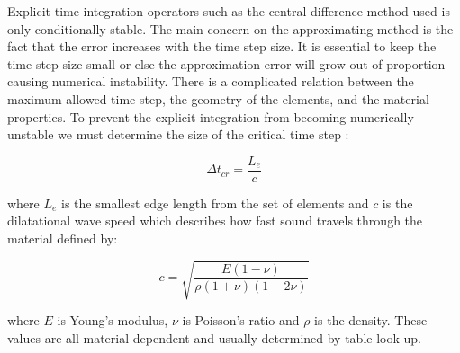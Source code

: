 Explicit time integration operators such as the central difference
method used is only conditionally stable. The main concern on the
approximating method is the fact that the error increases with the
time step size.
It is essential to keep the time step size small or else the
approximation error will grow out of proportion causing numerical
instability.
There is a complicated relation between the maximum allowed time step,
the geometry of the elements, and the material properties. To prevent
the explicit integration from becoming numerically unstable we must
determine the size of the critical time
step : 

\begin{equation}
\label{eq:delta-t-cr}
  \Delta t_{cr} = \frac{L_e}{c}
\end{equation}


where $L_e$ is the smallest edge length from the set of elements and
$c$ is the dilatational wave speed which describes how
fast sound travels through the material defined by:

\begin{equation*}
c = \sqrt{\frac{E(1-\nu)}{\rho(1+\nu)(1-2\nu)}}
\end{equation*}


where $E$ is Young's modulus, $\nu$ is Poisson's ratio and $\rho$ is
the density. These values are all material dependent and usually
determined by table look up. \\

